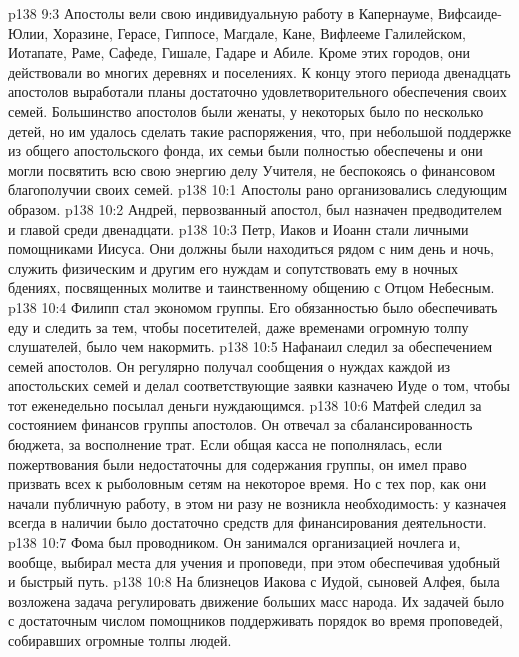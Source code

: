 \vs p138 9:3 \pc Апостолы вели свою индивидуальную работу в Капернауме, Вифсаиде\hyp{}Юлии, Хоразине, Герасе, Гиппосе, Магдале, Кане, Вифлееме Галилейском, Иотапате, Раме, Сафеде, Гишале, Гадаре и Абиле. Кроме этих городов, они действовали во многих деревнях и поселениях. К концу этого периода двенадцать апостолов выработали планы достаточно удовлетворительного обеспечения своих семей. Большинство апостолов были женаты, у некоторых было по несколько детей, но им удалось сделать такие распоряжения, что, при небольшой поддержке из общего апостольского фонда, их семьи были полностью обеспечены и они могли посвятить всю свою энергию делу Учителя, не беспокоясь о финансовом благополучии своих семей.
\vs p138 10:1 Апостолы рано организовались следующим образом.
\vs p138 10:2 \pc {}\bibnobreakspace Андрей, первозванный апостол, был назначен предводителем и главой среди двенадцати.
\vs p138 10:3 \pc {}\bibnobreakspace Петр, Иаков и Иоанн стали личными помощниками Иисуса. Они должны были находиться рядом с ним день и ночь, служить физическим и другим его нуждам и сопутствовать ему в ночных бдениях, посвященных молитве и таинственному общению с Отцом Небесным.
\vs p138 10:4 \pc {}\bibnobreakspace Филипп стал экономом группы. Его обязанностью было обеспечивать еду и следить за тем, чтобы посетителей, даже временами огромную толпу слушателей, было чем накормить.
\vs p138 10:5 \pc {}\bibnobreakspace Нафанаил следил за обеспечением семей апостолов. Он регулярно получал сообщения о нуждах каждой из апостольских семей и делал соответствующие заявки казначею Иуде о том, чтобы тот еженедельно посылал деньги нуждающимся.
\vs p138 10:6 \pc {}\bibnobreakspace Матфей следил за состоянием финансов группы апостолов. Он отвечал за сбалансированность бюджета, за восполнение трат. Если общая касса не пополнялась, если пожертвования были недостаточны для содержания группы, он имел право призвать всех к рыболовным сетям на некоторое время. Но с тех пор, как они начали публичную работу, в этом ни разу не возникла необходимость: у казначея всегда в наличии было достаточно средств для финансирования деятельности.
\vs p138 10:7 \pc {}\bibnobreakspace Фома был проводником. Он занимался организацией ночлега и, вообще, выбирал места для учения и проповеди, при этом обеспечивая удобный и быстрый путь.
\vs p138 10:8 \pc {}\bibnobreakspace На близнецов Иакова с Иудой, сыновей Алфея, была возложена задача регулировать движение больших масс народа. Их задачей было с достаточным числом помощников поддерживать порядок во время проповедей, собиравших огромные толпы людей.
